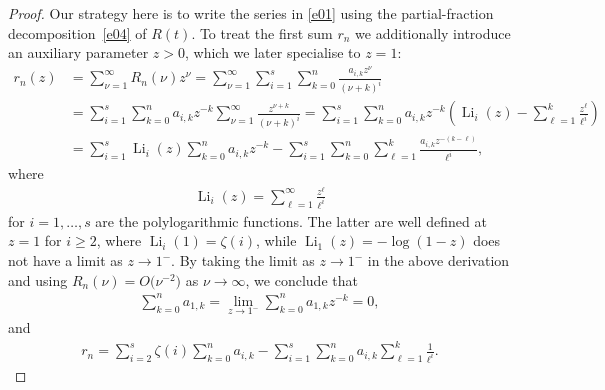 \documentclass[11pt]{article}
\newcommand{\Li}{\operatorname{Li}}
\begin{document}
\begin{proof}
Our strategy here is to write the series in \eqref{e01} using the partial-fraction decomposition~\eqref{e04} of $R(t)$. To treat the first sum $r_n$ we additionally introduce an auxiliary parameter $z>0$, which we later specialise to $z=1$:
\begin{align*}
r_n(z) &=\sum_{\nu=1}^\infty R_n(\nu)z^\nu
=\sum_{\nu=1}^\infty\sum_{i=1}^s\sum_{k=0}^n\frac{a_{i,k}z^\nu}{(\nu+k)^i}\\
&=\sum_{i=1}^s\sum_{k=0}^na_{i,k}z^{-k}\sum_{\nu=1}^\infty\frac{z^{\nu+k}}{(\nu+k)^i}
=\sum_{i=1}^s\sum_{k=0}^na_{i,k}z^{-k}\left(\Li_i(z)-\sum_{\ell=1}^k\frac{z^\ell}{\ell^i}\right)\\
&=\sum_{i=1}^s\Li_i(z)\sum_{k=0}^na_{i,k}z^{-k}-\sum_{i=1}^s\sum_{k=0}^n\sum_{\ell=1}^k\frac{a_{i,k}z^{-(k-\ell)}}{\ell^i},
\end{align*}
where
\begin{gather*}
\Li_i(z)=\sum_{\ell=1}^\infty\frac{z^\ell}{\ell^i}
\end{gather*}
for $i=1,\dots,s$ are the polylogarithmic functions. The latter are well defined at $z=1$ for $i\ge2$, where $\Li_i(1)=\zeta(i)$, while $\Li_1(z)=-\log(1-z)$ does not have a limit as $z\to1^-$. By taking the limit as $z\to1^-$ in the above derivation and using $R_n(\nu)=O\big(\nu^{-2}\big)$ as $\nu\to\infty$, we conclude that
\begin{gather*}
\sum_{k=0}^na_{1,k}=\lim_{z\to1^-}\sum_{k=0}^na_{1,k}z^{-k}=0,
\end{gather*}
and
\begin{gather}
r_n=\sum_{i=2}^s\zeta(i)\sum_{k=0}^na_{i,k}-\sum_{i=1}^s\sum_{k=0}^na_{i,k}\sum_{\ell=1}^k\frac1{\ell^i}.\label{e07}
\end{gather}


\end{proof}
\end{document}
